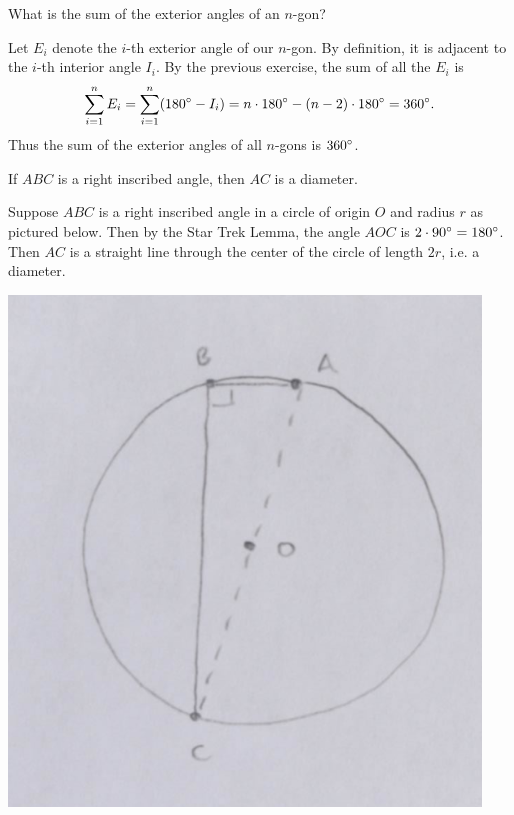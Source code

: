 \documentclass[twoside,10pt]{article}
\begin{document}
\newpage

\begin{exer}[1.23]
What is the sum of the exterior angles of an $n$-gon?
\end{exer}

Let $E_i$ denote the $i$-th exterior angle of our $n$-gon. By definition, it is adjacent to the $i$-th interior angle $I_{i}$. By the previous exercise, the sum of all the $E_{i}$ is
\[
	\sum_{i=1}^{n} E_{i} = \sum_{i=1}^{n} (180^\circ - I_{i}) = n \cdot 180^\circ - (n-2)\cdot 180^\circ = 360^\circ.
\] 
Thus the sum of the exterior angles of all $n$-gons is $360^\circ$.

\newpage

\begin{exer}[1.28]
	If $ABC$ is a right inscribed angle, then $AC$ is a diameter.
\end{exer}

Suppose $ABC$ is a right inscribed angle in a circle of origin $O$ and radius $r$ as pictured below. Then by the Star Trek Lemma, the angle $AOC$ is $2 \cdot 90^\circ = 180^\circ$. Then $AC$ is a straight line through the center of the circle of length $2r$, i.e. a diameter.

\begin{center}
        \includegraphics[scale=0.7]{fig/4}
\end{center}

\newpage
\end{document}
